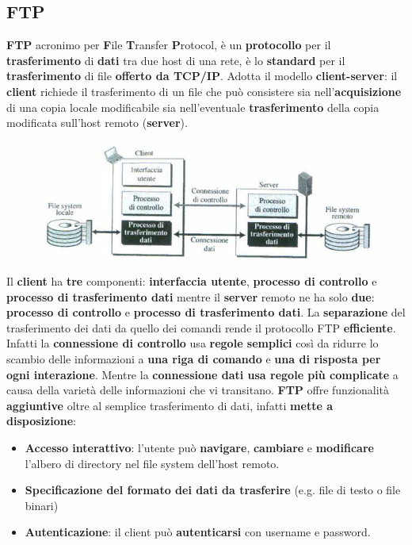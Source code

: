 \documentclass[11pt,a4paper,oneside]{book}
\theoremstyle{definition}
\begin{document}
\pagebreak

\subsection{FTP}
\label{sec:FTP}
\textbf{FTP} acronimo per \textbf{F}ile \textbf{T}ransfer \textbf{P}rotocol, è un \textbf{protocollo} per il \textbf{trasferimento} di \textbf{dati} tra due host di una rete, è lo \textbf{standard} per il \textbf{trasferimento} di file \textbf{offerto da TCP/IP}. Adotta il modello \textbf{client-server}: il \textbf{client} richiede il trasferimento di un file che può consistere sia nell'\textbf{acquisizione} di una copia locale modificabile sia nell'eventuale \textbf{trasferimento} della copia modificata sull'host remoto (\textbf{server}).
\begin{figure}[!h]
	\includegraphics[scale=0.4]{Immagini/FTP.png}
	\centering
\end{figure}\newline
Il \textbf{client} ha \textbf{tre} componenti: \textbf{interfaccia utente}, \textbf{processo di controllo} e \textbf{processo di trasferimento dati} mentre il \textbf{server} remoto ne ha solo \textbf{due}: \textbf{processo di controllo} e \textbf{processo di trasferimento dati}. La \textbf{separazione} del trasferimento dei dati da quello dei comandi rende il protocollo FTP \textbf{efficiente}. Infatti la \textbf{connessione di controllo} usa \textbf{regole semplici} così da ridurre lo scambio delle informazioni a \textbf{una riga di comando} e \textbf{una di risposta per ogni interazione}. Mentre la \textbf{connessione dati usa regole più complicate} a causa della varietà delle informazioni che vi transitano.
\textbf{FTP} offre funzionalità \textbf{aggiuntive} oltre al semplice trasferimento di dati, infatti \textbf{mette a disposizione}:
\begin{itemize}
	\item \textbf{Accesso interattivo}: l’utente può \textbf{navigare}, \textbf{cambiare} e \textbf{modificare} l’albero di directory nel file system dell'host remoto.
	\item \textbf{Specificazione del formato dei dati da trasferire} (e.g. file di testo o file binari)
	\item \textbf{Autenticazione}: il client può \textbf{autenticarsi} con username e password.
\end{itemize}
\end{document}
